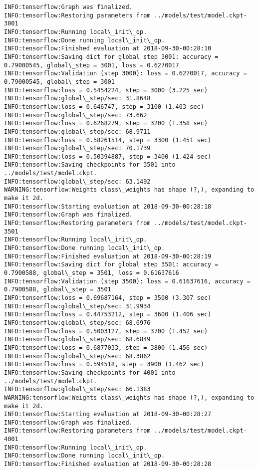 \documentclass[11pt]{article}
\begin{document}
\begin{Verbatim}[commandchars=\\\{\}]
INFO:tensorflow:Graph was finalized.
INFO:tensorflow:Restoring parameters from ../models/test/model.ckpt-3001
INFO:tensorflow:Running local\_init\_op.
INFO:tensorflow:Done running local\_init\_op.
INFO:tensorflow:Finished evaluation at 2018-09-30-00:28:10
INFO:tensorflow:Saving dict for global step 3001: accuracy = 0.79000545, global\_step = 3001, loss = 0.6270017
INFO:tensorflow:Validation (step 3000): loss = 0.6270017, accuracy = 0.79000545, global\_step = 3001
INFO:tensorflow:loss = 0.5454224, step = 3000 (3.225 sec)
INFO:tensorflow:global\_step/sec: 31.8648
INFO:tensorflow:loss = 0.646747, step = 3100 (1.403 sec)
INFO:tensorflow:global\_step/sec: 73.662
INFO:tensorflow:loss = 0.6268279, step = 3200 (1.358 sec)
INFO:tensorflow:global\_step/sec: 68.9711
INFO:tensorflow:loss = 0.58261514, step = 3300 (1.451 sec)
INFO:tensorflow:global\_step/sec: 70.1739
INFO:tensorflow:loss = 0.50394887, step = 3400 (1.424 sec)
INFO:tensorflow:Saving checkpoints for 3501 into ../models/test/model.ckpt.
INFO:tensorflow:global\_step/sec: 63.1492
WARNING:tensorflow:Weights class\_weights has shape (?,), expanding to make it 2d.
INFO:tensorflow:Starting evaluation at 2018-09-30-00:28:18
INFO:tensorflow:Graph was finalized.
INFO:tensorflow:Restoring parameters from ../models/test/model.ckpt-3501
INFO:tensorflow:Running local\_init\_op.
INFO:tensorflow:Done running local\_init\_op.
INFO:tensorflow:Finished evaluation at 2018-09-30-00:28:19
INFO:tensorflow:Saving dict for global step 3501: accuracy = 0.7900588, global\_step = 3501, loss = 0.61637616
INFO:tensorflow:Validation (step 3500): loss = 0.61637616, accuracy = 0.7900588, global\_step = 3501
INFO:tensorflow:loss = 0.69687164, step = 3500 (3.307 sec)
INFO:tensorflow:global\_step/sec: 31.9934
INFO:tensorflow:loss = 0.44753212, step = 3600 (1.406 sec)
INFO:tensorflow:global\_step/sec: 68.6976
INFO:tensorflow:loss = 0.5003127, step = 3700 (1.452 sec)
INFO:tensorflow:global\_step/sec: 68.6849
INFO:tensorflow:loss = 0.6877033, step = 3800 (1.456 sec)
INFO:tensorflow:global\_step/sec: 68.3862
INFO:tensorflow:loss = 0.594518, step = 3900 (1.462 sec)
INFO:tensorflow:Saving checkpoints for 4001 into ../models/test/model.ckpt.
INFO:tensorflow:global\_step/sec: 66.1383
WARNING:tensorflow:Weights class\_weights has shape (?,), expanding to make it 2d.
INFO:tensorflow:Starting evaluation at 2018-09-30-00:28:27
INFO:tensorflow:Graph was finalized.
INFO:tensorflow:Restoring parameters from ../models/test/model.ckpt-4001
INFO:tensorflow:Running local\_init\_op.
INFO:tensorflow:Done running local\_init\_op.
INFO:tensorflow:Finished evaluation at 2018-09-30-00:28:28

\end{Verbatim}
\end{document}
